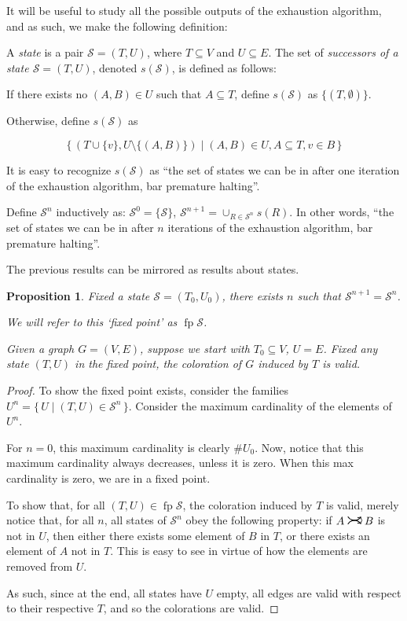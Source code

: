 \documentclass[11pt]{article}
\newcommand{\cS}{\mathcal{S}}
\DeclareMathOperator{\fp}{fp}
\newcommand{\rightcurvearrow}{
\mathrel{
  \begin{tikzpicture}[scale=0.8]
    \draw[thick,->] (0,1ex) arc (30:150:-2ex);
    \draw[thick,->] (0,-1ex) arc (150:30:2ex);
  \end{tikzpicture}
}
}
\newtheorem{prop}{Proposition}
\begin{document}
It will be useful to study all the possible outputs of the exhaustion algorithm, and as such, we make the following definition:

A \emph{state} is a pair $\cS = (T,U)$, where $T \subseteq V$ and $U \subseteq E$. The set of \emph{successors of a state $\cS = (T,U)$}, denoted $s(\cS)$, is defined as follows:

If there exists no $(A,B) \in U$ such that $A \subseteq T$, define $s(\cS)$ as $\{(T, \emptyset)\}$.

Otherwise, define $s(\cS)$ as

\[ \{ \, (T \cup \{v\}, U \setminus \{(A,B)\}) \mid (A,B) \in U, A \subseteq T, v \in B \, \}\]

It is easy to recognize $s(\cS)$ as ``the set of states we can be in after one iteration of the exhaustion algorithm, bar premature halting''.

Define $\cS^n$ inductively as: $\cS^0 = \{\cS\}$, $\cS^{n+1} = \cup_{R \in \cS^n} s(R)$. In other words, ``the set of states we can be in after $n$ iterations of the exhaustion algorithm, bar premature halting''.

The previous results can be mirrored as results about states.

\begin{prop}
Fixed a state $\cS = (T_0, U_0)$, there exists $n$ such that $\cS^{n+1} = \cS^n$.

We will refer to this `fixed point' as $\fp \cS$.

Given a graph $G = (V,E)$, suppose we start with $T_0 \subseteq V$, $U = E$. Fixed any state $(T,U)$ in the fixed point, the coloration of $G$ induced by $T$ is valid.
\end{prop}

\begin{proof}
To show the fixed point exists, consider the families $U^n = \{\,U\mid (T,U) \in \cS^n\,\}$. Consider the maximum cardinality of the elements of $U^n$.

For $n = 0$, this maximum cardinality is clearly $\# U_0$. Now, notice that this maximum cardinality always decreases, unless it is zero. When this max cardinality is zero, we are in a fixed point.

To show that, for all $(T,U) \in \fp \cS$, the coloration induced by $T$ is valid, merely notice that, for all $n$, all states of $\cS^n$ obey the following property: if $A \rightcurvearrow B$ is not in $U$, then either there exists some element of $B$ in $T$, or there exists an element of $A$ not in $T$. This is easy to see in virtue of how the elements are removed from $U$.

As such, since at the end, all states have $U$ empty, all edges are valid with respect to their respective $T$, and so the colorations are valid.

\end{proof}
\end{document}
